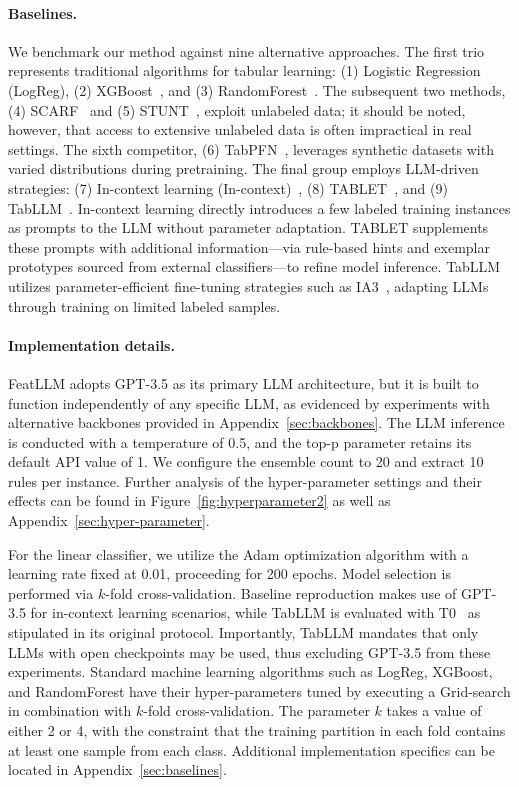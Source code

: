 \vspace*{-0.12in}
\paragraph{Baselines.}
We benchmark our method against nine alternative approaches. The first trio represents traditional algorithms for tabular learning: (1) Logistic Regression (LogReg), (2) XGBoost~\cite{chen2016xgboost}, and (3) RandomForest~\cite{ho1995random}. The subsequent two methods, (4) SCARF~\cite{bahri2022scarf} and (5) STUNT~\cite{nam2023stunt}, exploit unlabeled data; it should be noted, however, that access to extensive unlabeled data is often impractical in real settings. The sixth competitor, (6) TabPFN~\cite{hollmann2022tabpfn}, leverages synthetic datasets with varied distributions during pretraining. The final group employs LLM-driven strategies: (7) In-context learning (In-context)~\cite{wei2022emergent}, (8) TABLET~\cite{slack2023tablet}, and (9) TabLLM~\cite{hegselmann2023tabllm}. In-context learning directly introduces a few labeled training instances as prompts to the LLM without parameter adaptation. TABLET supplements these prompts with additional information—via rule-based hints and exemplar prototypes sourced from external classifiers—to refine model inference. TabLLM utilizes parameter-efficient fine-tuning strategies such as IA3~\cite{liu2022few}, adapting LLMs through training on limited labeled samples.

\vspace*{-0.12in}
\paragraph{Implementation details.}
\textsf{FeatLLM} adopts GPT-3.5 as its primary LLM architecture, but it is built to function independently of any specific LLM, as evidenced by experiments with alternative backbones provided in Appendix~\ref{sec:backbones}. The LLM inference is conducted with a temperature of 0.5, and the top-p parameter retains its default API value of 1. We configure the ensemble count to 20 and extract 10 rules per instance. Further analysis of the hyper-parameter settings and their effects can be found in Figure~\ref{fig:hyperparameter2} as well as Appendix~\ref{sec:hyper-parameter}.

For the linear classifier, we utilize the Adam optimization algorithm with a learning rate fixed at 0.01, proceeding for 200 epochs. Model selection is performed via $k$-fold cross-validation. Baseline reproduction makes use of GPT-3.5 for in-context learning scenarios, while TabLLM is evaluated with T0~\cite{sanh2022multitask} as stipulated in its original protocol. Importantly, TabLLM mandates that only LLMs with open checkpoints may be used, thus excluding GPT-3.5 from these experiments. Standard machine learning algorithms such as LogReg, XGBoost, and RandomForest have their hyper-parameters tuned by executing a Grid-search in combination with $k$-fold cross-validation. The parameter $k$ takes a value of either 2 or 4, with the constraint that the training partition in each fold contains at least one sample from each class. Additional implementation specifics can be located in Appendix~\ref{sec:baselines}.

